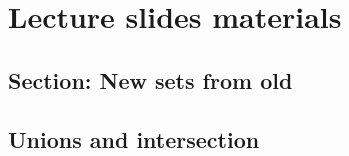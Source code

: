 
\section{Lecture slides materials}

 \subsection{Section: New sets from old}   
 
 \subsection{Unions and intersection}
 

\begin{equation}\label{slides_session2_76}

\end{equation}
 \begin{equation}\label{slides_session2_77}

\end{equation}
\begin{equation}\label{slides_session2_78}

\end{equation}
 \begin{equation}\label{slides_session2_79}

\end{equation}
 \begin{equation}\label{slides_session2_80}

\end{equation}
 \begin{equation}\label{slides_session2_81}

\end{equation}
\begin{equation}\label{slides_session2_82}

\end{equation}
 \begin{equation}\label{slides_session2_83}

\end{equation}
\begin{equation}\label{slides_session2_84}

\end{equation}
 \begin{equation}\label{slides_session2_85}

\end{equation}
\begin{equation}\label{slides_session2_86}

\end{equation}
